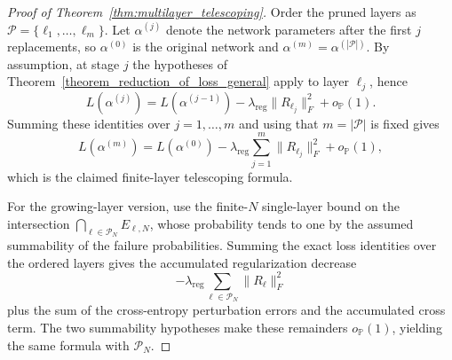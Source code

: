 \documentclass[11pt]{article}
\theoremstyle{plain}
\theoremstyle{definition}
\theoremstyle{remark}
\newcommand{\PP}{\mathbb{P}}
\newcommand{\1}{\mathbf{1}}
\begin{document}
\begin{proof}[Proof of Theorem~\ref{thm:multilayer_telescoping}]
Order the pruned layers as \(\mathcal P=\{\ell_1,\dots,\ell_m\}\). Let \(\alpha^{(j)}\) denote the network parameters after the first \(j\) replacements, so \(\alpha^{(0)}\) is the original network and \(\alpha^{(m)}=\alpha^{(|\mathcal P|)}\). By assumption, at stage \(j\) the hypotheses of Theorem~\ref{theorem_reduction_of_loss_general} apply to layer \(\ell_j\), hence
\[
L(\alpha^{(j)})
=
L(\alpha^{(j-1)})-\lambda_{\mathrm{reg}}\|R_{\ell_j}\|_F^2+o_{\PP}(1).
\]
Summing these identities over \(j=1,\dots,m\) and using that \(m=|\mathcal P|\) is fixed gives
\[
L(\alpha^{(m)})
=
L(\alpha^{(0)})-\lambda_{\mathrm{reg}}\sum_{j=1}^{m}\|R_{\ell_j}\|_F^2+o_{\PP}(1),
\]
which is the claimed finite-layer telescoping formula.

For the growing-layer version, use the finite-\(N\) single-layer bound on the intersection \(\bigcap_{\ell\in\mathcal P_N}E_{\ell,N}\), whose probability tends to one by the assumed summability of the failure probabilities. Summing the exact loss identities over the ordered layers gives the accumulated regularization decrease
\[
-\lambda_{\mathrm{reg}}\sum_{\ell\in\mathcal P_N}\|R_\ell\|_F^2
\]
plus the sum of the cross-entropy perturbation errors and the accumulated cross term. The two summability hypotheses make these remainders \(o_{\PP}(1)\), yielding the same formula with \(\mathcal P_N\).
\end{proof}
\end{document}
